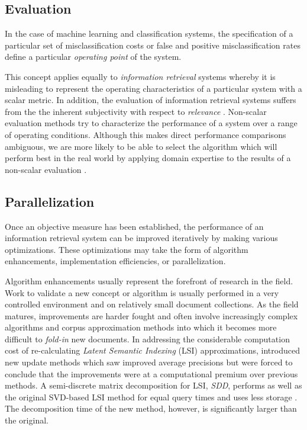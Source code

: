 \documentclass[10pt]{report}
\begin{document}
\subsection{Evaluation}
In the case of machine learning and classification systems, the
specification of a particular set of misclassification costs or false
and positive misclassification rates define a particular
\textit{operating point} of the system.

This concept applies equally to \textit{information retrieval} systems
whereby it is misleading to represent the operating characteristics of
a particular system with a scalar metric. In addition, the evaluation
of information retrieval systems suffers from the the inherent
subjectivity with respect to \textit{relevance}
\cite{RefWorks:72}. Non-scalar evaluation methods try to characterize
the performance of a system over a range of operating
conditions. Although this makes direct performance comparisons
ambiguous, we are more likely to be able to select the algorithm which
will perform best in the real world by applying domain expertise to
the results of a non-scalar evaluation \cite{RefWorks:32}.


\subsection{Parallelization}
Once an objective measure has been established, the performance of an
information retrieval system can be improved iteratively by making
various optimizations. These optimizations may take the form of
algorithm enhancements, implementation efficiencies, or
parallelization. 

Algorithm enhancements usually represent the forefront of research in
the field. Work to validate a new concept or algorithm is usually
performed in a very controlled environment and on relatively small
document collections. As the field matures, improvements are harder
fought and often involve increasingly complex algorithms and corpus
approximation methods into which it becomes more difficult to
\textit{fold-in} new documents. In addressing the considerable
computation cost of re-calculating \textit{Latent Semantic Indexing}
(LSI) \cite{RefWorks:102} approximations, \cite{RefWorks:101}
introduced new update methods which saw improved average precisions
but were forced to conclude that the improvements were at a
computational premium over previous methods. A semi-discrete matrix
decomposition for LSI, \textit{SDD}, performs as well as the original
SVD-based LSI method for equal query times and uses less storage
\cite{RefWorks:99}. The decomposition time of the new method, however,
is significantly larger than the original.
\end{document}
